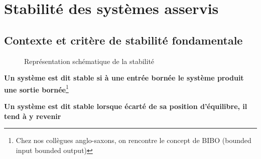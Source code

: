 \chapter{Stabilité des systèmes asservis\label{chap-stab}}
\minitoc
\newpage
\section{Contexte et critère de stabilité fondamentale}
\begin{figure}[!h]
    \centering
    
    \caption{Représentation schématique de la stabilité}
\end{figure}
\textbf{Un système est dit stable si à une entrée bornée le système produit 
une sortie bornée}\footnote{Chez nos collègues anglo-saxons, on rencontre le 
concept de BIBO (\og bounded input bounded output\fg)}

\textbf{Un système est dit stable lorsque écarté de sa position d'équilibre, il 
tend à y revenir}

